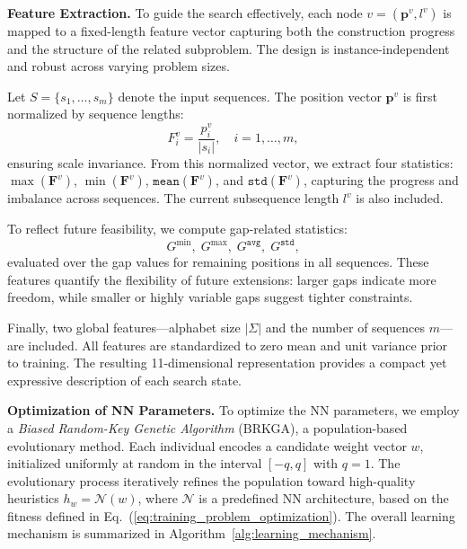 \documentclass[runningheads]{llncs}
\begin{document}
\medskip
\noindent\textbf{Feature Extraction.}
To guide the search effectively, each node $v=(\mathbf{p}^v, l^v)$ is mapped to a fixed-length feature vector capturing both the construction progress and the structure of the related subproblem. The design is instance-independent and robust across varying problem sizes.

Let $S=\{s_1,\ldots,s_m\}$ denote the input sequences. The position vector $\mathbf{p}^v$ is first normalized by sequence lengths:
\[
F^v_i = \frac{p^v_i}{|s_i|}, \quad i=1,\ldots,m,
\]
ensuring scale invariance. From this normalized vector, we extract four statistics: $\max(\mathbf{F}^v)$, $\min(\mathbf{F}^v)$, $\texttt{mean}(\mathbf{F}^v)$, and $\texttt{std}(\mathbf{F}^v)$, capturing the progress and imbalance across sequences. The current subsequence length $l^v$ is also included.

To reflect future feasibility, we compute gap-related statistics:
\[
G^{\min}, \; G^{\max}, \; G^{\texttt{avg}}, \; G^{\texttt{std}},
\]
evaluated over the gap values for remaining positions in all sequences. These features quantify the flexibility of future extensions: larger gaps indicate more freedom, while smaller or highly variable gaps suggest tighter constraints.

Finally, two global features—alphabet size $|\Sigma|$ and the number of sequences $m$—are included. All features are standardized to zero mean and unit variance prior to training. The resulting 11-dimensional representation provides a compact yet expressive description of each search state.

\medskip
\noindent\textbf{Optimization of NN Parameters.}
To optimize the NN parameters, we employ a \textit{Biased Random-Key Genetic Algorithm} (BRKGA), a population-based evolutionary method. Each individual encodes a candidate weight vector $w$, initialized uniformly at random in the interval $[-q,q]$ with $q=1$. The evolutionary process iteratively refines the population toward high-quality heuristics $h_w=\mathcal{N}(w)$, where $\mathcal{N}$ is a predefined NN architecture, based on the fitness defined in Eq.~(\ref{eq:training_problem_optimization}). The overall learning mechanism is summarized in Algorithm~\ref{alg:learning_mechanism}.
\end{document}
